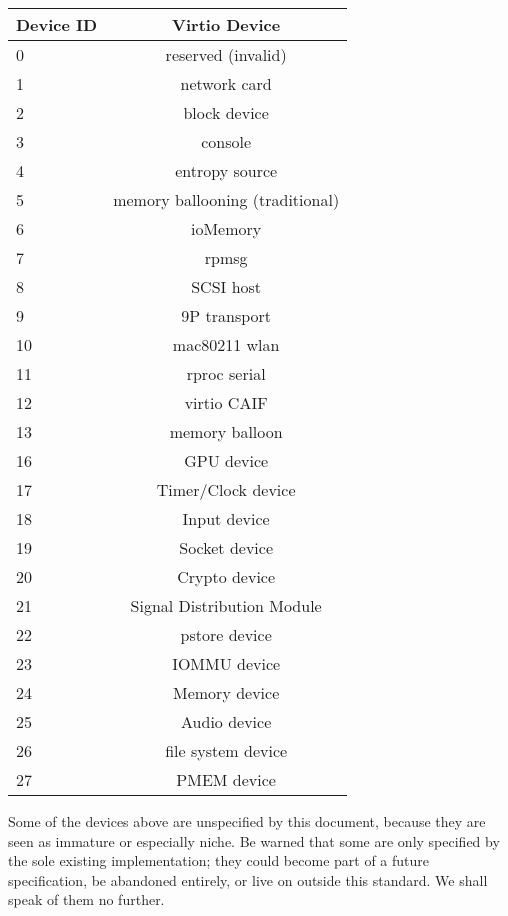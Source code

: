 \begin{tabular} { |l|c| }
\hline
Device ID  &  Virtio Device    \\
\hline \hline
0          & reserved (invalid) \\
\hline
1          &   network card     \\
\hline
2          &   block device     \\
\hline
3          &      console       \\
\hline
4          &  entropy source    \\
\hline
5          & memory ballooning (traditional)  \\
\hline
6          &     ioMemory       \\
\hline
7          &       rpmsg        \\
\hline
8          &     SCSI host      \\
\hline
9          &   9P transport     \\
\hline
10         &   mac80211 wlan    \\
\hline
11         &   rproc serial     \\
\hline
12         &   virtio CAIF      \\
\hline
13         &  memory balloon    \\
\hline
16         &   GPU device       \\
\hline
17         &   Timer/Clock device \\
\hline
18         &   Input device \\
\hline
19         &   Socket device \\
\hline
20         &   Crypto device \\
\hline
21         &   Signal Distribution Module \\
\hline
22         &   pstore device \\
\hline
23         &   IOMMU device \\
\hline
24         &   Memory device \\
\hline
25         &   Audio device \\
\hline
26         &   file system device \\
\hline
27         &   PMEM device \\
\hline
\end{tabular}

Some of the devices above are unspecified by this document,
because they are seen as immature or especially niche.  Be warned
that some are only specified by the sole existing implementation;
they could become part of a future specification, be abandoned
entirely, or live on outside this standard.  We shall speak of
them no further.

